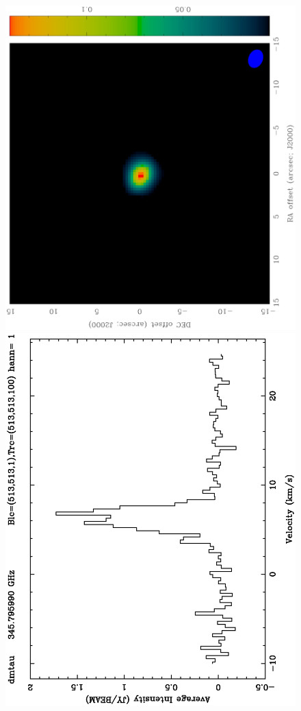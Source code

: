\begin{figure}
\centering
\begin{minipage}{20pc}
\centering
\includegraphics[height=0.137\textheight,angle=-90]{part7/Zhao_P36/f2a.ps}
\includegraphics[height=0.155\textheight,angle=-90]{part7/Zhao_P36/f2c.ps}

\end{minipage}
\end{figure}

